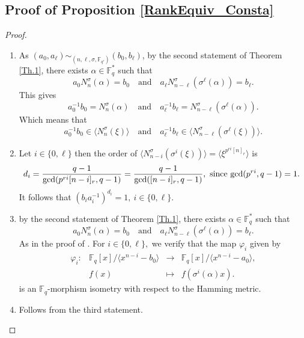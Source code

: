 \documentclass[12pt,paper]{article}
\theoremstyle{plain}
\newcommand{\Fq}{\mathbb{F}_{q}}
\begin{document}
\subsection{Proof of Proposition \ref{RankEquiv_Consta}}
\begin{proof}
\begin{enumerate}
\item  As $ (a_0, a_{\ell}) \sim_{(n,\ell,\sigma, \mathbb{F}_{q'})} (b_0, b_{\ell})$, by the second  statement of Theorem \ref{Th.1}, 
there exists $\alpha\in \Fq^*$ such that $$ a_0 N_n^{\sigma}(\alpha)  = b_0   \quad  \text{and} \quad   a_{\ell} N^{\sigma}_{n-\ell}(\sigma^{\ell}(\alpha))=  b_{\ell}. $$
This gives
$$ a_0^{-1}  b_0 = N_n^{\sigma}(\alpha)  \quad  \text{and} \quad   a_{\ell}^{-1}   b_{\ell}=  N^{\sigma}_{n-\ell}(\sigma^{\ell}(\alpha)) . $$
Which means that  
$$ a_0^{-1}  b_0 \in   \langle  N_n^{\sigma}(\xi) \rangle  \quad  \text{and} \quad   a_{\ell}^{-1}   b_{\ell} \in  
\langle   N^{\sigma}_{n-\ell}(\sigma^{\ell}(\xi))  \rangle. $$

\item Let   $i\in \{0,\ell\}$ then the order of $ \langle   N^{\sigma}_{n-i}(\sigma^{i}(\xi))  \rangle =
\langle   \xi^{p^{ri}[n]_r}  \rangle $ is  $$d_i=\dfrac{q-1}{\gcd(p^{ri}[n-i]_r, q-1)}= \dfrac{q-1}{\gcd([n-i]_r, q-1)} , \text{ since $ \gcd(p^{ri},q-1)=1.$ }$$  It follows that  $(b_i a_i^{-1})^{d_i} =1 ,\ i\in \{0,\ell\}.$
\item by the second  statement of Theorem \ref{Th.1}, 
there exists $\alpha\in \Fq^*$ such that $$ a_0 N_n^{\sigma}(\alpha)  = b_0   \quad  \text{and} \quad   a_{\ell} N^{\sigma}_{n-\ell}(\sigma^{\ell}(\alpha))=  b_{\ell}. $$  As in the proof of \cite[Theorem 6]{Ouazzou2025}. For $i\in \{0,\ell\},$ we verify
 that the  map  $\varphi_i$ given by 
\begin{equation}
  	\begin{array}{cccc}
  	\varphi_{i}:& \mathbb{F}_q[x] /\langle x^{n-i}-b_0 \rangle  &\longrightarrow & \mathbb{F}_q[x] /\langle x^{n-i}-a_0 \rangle, \\
  	& f(x) & \longmapsto &  f(\sigma^i(\alpha) x).
  	\end{array}
  	\end{equation} 
    is an $\Fq$-morphism isometry with respect to the Hamming  metric.
    \item Follows from the third statement.
\end{enumerate}
\end{proof}
\end{document}
